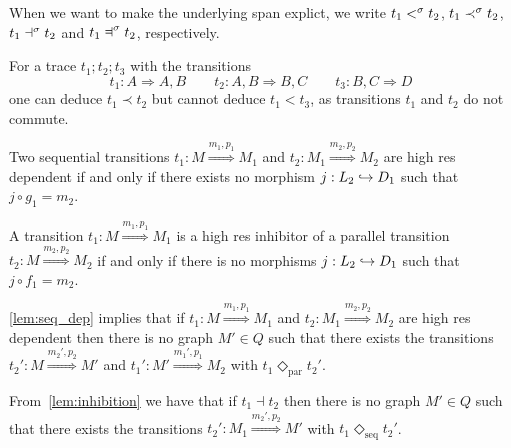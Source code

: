 When we want to make the underlying span explict, we write $t_1 <^{\sigma} t_2$, $t_1 \prec^{\sigma} t_2$, $t_1 \dashv^{\sigma} t_2$ and $t_1 \Dashv^{\spa} t_2$, respectively.

\begin{example}
  For a trace $t_1;t_2;t_3$ with the transitions
  \[
  t_1: A \Rightarrow A,B\qquad t_2: A,B\Rightarrow B,C \qquad t_3: B,C\Rightarrow D
  \]
  one can deduce $t_1\prec t_2$ but cannot deduce $t_1<t_3$, as transitions $t_1$ and $t_2$ do not commute.
\end{example}

\begin{lemma}
  \label{lem:seq_dep}
  Two sequential transitions $t_1:M\overset{m_1,p_1}{\Rightarrow} M_1$ and $t_2:M_1\overset{m_2,p_2}{\Rightarrow} M_2$ are high res dependent if and only if there exists no morphism $j:L_2\hookrightarrow D_1$ such that $j\circ g_1= m_2$.
\end{lemma}

\begin{lemma}
  \label{lem:inhibition}
  A transition $t_1:M\overset{m_1,p_1}{\Rightarrow} M_1$ is a high res inhibitor of a parallel transition $t_2:M\overset{m_2,p_2}{\Rightarrow} M_2$ if and only if there is no morphisms $j:L_2\hookrightarrow D_1$ such that $j\circ f_1= m_2$.
\end{lemma}

\autoref{lem:seq_dep} implies that if $t_1:M\overset{m_1,p_1}{\Rightarrow} M_1$ and $t_2:M_1\overset{m_2,p_2}{\Rightarrow} M_2$ are high res dependent then there is no graph $M'\in Q$ such that there exists the transitions
$t_2':M\overset{m_2',p_2}{\Rightarrow} M'$ and $t_1':M'\overset{m_1',p_1}{\Rightarrow} M_2$ with $t_1\Diamond_{\text{par}}t_2'$.

From~\autoref{lem:inhibition} we have that if $t_1 \dashv t_2$ then there is no graph $M'\in Q$ such that there exists the transitions $t_2':M_1\overset{m_2',p_2}{\Rightarrow} M'$ with $t_1\Diamond_{\text{seq}}t_2'$.


